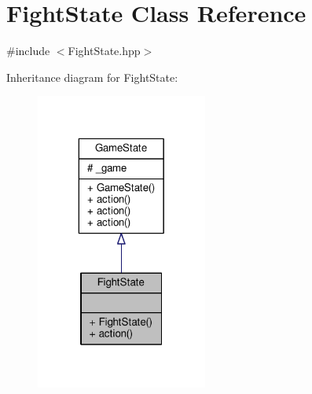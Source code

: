 \hypertarget{class_fight_state}{\section{Fight\-State Class Reference}
\label{class_fight_state}
}


{\ttfamily \#include $<$Fight\-State.\-hpp$>$}



Inheritance diagram for Fight\-State\-:\nopagebreak
\begin{figure}[H]
\begin{center}
\leavevmode
\includegraphics[width=160pt]{class_fight_state__inherit__graph}
\end{center}
\end{figure}


